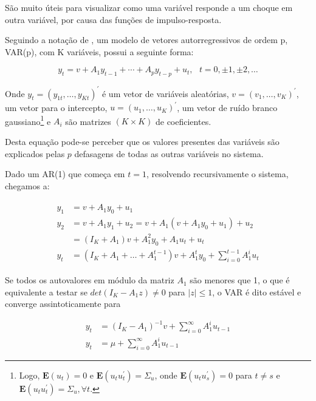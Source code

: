 \documentclass[a4paper,
               article,
               12pt,
               openany,
               oneside,
               english,
               brazil]{abntex2}
\numberwithin{equation}{section}
\begin{document}
    São muito úteis para visualizar como uma variável responde a um choque em outra variável, por causa das funções de impulso-resposta. 

    Seguindo a notação de \textcite[p.~13]{lutkepool}, um modelo de vetores autorregressivos de ordem p, VAR(p), com K variáveis, possui a seguinte forma:

    \begin{equation}
        \label{VAR}
        y_t = v + A_1 y_{t-1} + \cdots + A_p y_{t-p} + u_t,\text{\ \ } t = 0, \pm 1, \pm 2, \ldots
    \end{equation}

    Onde $ y_t = (y_{1t}, \ldots, y_{Kt})^{'} $ é um vetor de variáveis aleatórias, $ v  = (v_{1}, \ldots, v_{K})^{'}  $, um vetor para o intercepto, $ u = (u_{1}, \ldots, u_{K})^{'} $, um vetor de ruído branco gaussiano\footnote{Logo, $ \mathbf{E}(u_t) = 0 $ e $ \mathbf{E}(u_t u^{'}_t) = \Sigma_{u} $, onde $ \mathbf{E}(u_tu^{'}_s) = 0 $ para $ t \neq s $ e $ \mathbf{E}(u_t u^{'}_t) = \Sigma_u, \forall t $.} e $ A_i $ são matrizes $ (K \times K) $ de coeficientes.

    Desta equação pode-se perceber que os valores presentes das variáveis são explicados pelas $ p $ defasagens de todas as outras variáveis no sistema.

    Dado um AR(1) que começa em $ t = 1 $, resolvendo recursivamente o sistema, chegamos a:

    \begin{align}
        \label{VAR1}
        \begin{aligned}
        y_1 &= v + A_1 y_0 + u_1 \\
        y_2 &= v + A_1 y_1 + u_2 = v + A_1(v + A_1y_0 + u_1) + u_2 \\
            &= (I_K + A_1)v + A^{2}_1 y_0 + A_1 u_t + u_t \\
        y_t &= (I_K + A_1 + \dots + A^{t-1}_1)v + A^{t}_1 y_0 + \sum^{t-1}_{i=0} A^{i}_1 u_t
        \end{aligned}
    \end{align}

    Se todos os autovalores em módulo da matriz $ A_1 $ são menores que 1, o que é equivalente a testar se $ det(I_{K} - A_1z) \neq 0 $ para $ \lvert z \rvert \leq 1 $, o VAR é dito estável e converge assintoticamente para

    \begin{equation}
        \label{ma}
        \begin{aligned}
        y_t &= (I_K - A_1)^{-1} v + \sum^{\infty}_{i=0} A^{i}_1 u_{t-1} \\
        y_t &= \mu + \sum^{\infty}_{i=0} A^{i}_1 u_{t-1}
        \end{aligned}
    \end{equation}
\end{document}
